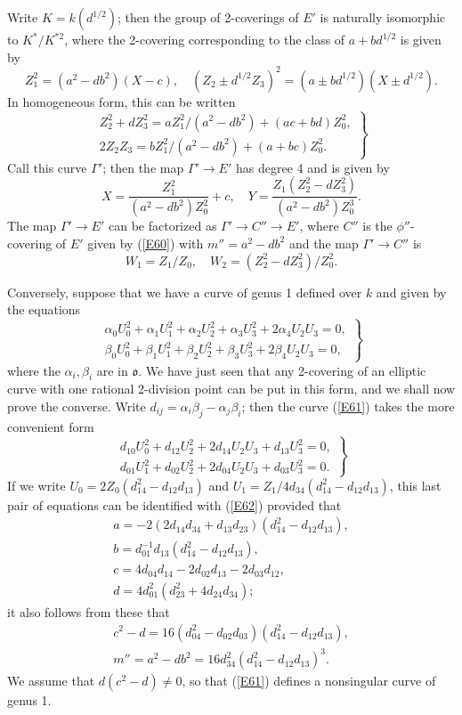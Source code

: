 \documentclass[12pt]{article}
\def\fo{{\mathfrak o}}
\def\ga{{\alpha}}
\def\gb{{\beta}}
\def\gG{{\Gamma}}
\def\beq{\begin{equation} \label}
\begin{document}
Write $K=k(d^{1/2})$; then the group of 2-coverings of $E'$
is naturally isomorphic to $K^*/K^{*2}$, where the 2-covering
corresponding to the class of $a+bd^{1/2}$ is given by
\[ Z_1^2=(a^2-db^2)(X-c), \quad
(Z_2\pm d^{1/2}Z_3)^2=(a\pm bd^{1/2})(X\pm d^{1/2}). \]
In homogeneous form, this can be written
\beq{E62} \left. \begin{array}{c}
Z_2^2+dZ_3^2=aZ_1^2/(a^2-db^2)+(ac+bd)Z_0^2, \\
2Z_2Z_3=bZ_1^2/(a^2-db^2)+(a+bc)Z_0^2.
\end{array} \right\} \end{equation}
Call this curve $\gG'$; then the map
$\gG'\rightarrow E'$ has degree 4 and is given by
\[ X=\frac{Z_1^2}{(a^2-db^2)Z_0^2}+c, \quad
Y=\frac{Z_1(Z_2^2-dZ_3^2)}{(a^2-db^2)Z_0^3}. \]
The map $\gG'\rightarrow E'$ can be factorized as
$\gG'\rightarrow C''\rightarrow E'$, where $C''$ is the
$\phi''$-covering of $E'$ given by (\ref{E60}) with
$m''=a^2-db^2$ and the map $\gG'\rightarrow C''$ is
\[ W_1=Z_1/Z_0, \quad W_2=(Z_2^2-dZ_3^2)/Z_0^2. \]

Conversely, suppose that we have a curve of genus 1 defined
over $k$ and given by the equations
\beq{E61} \left. \begin{array}{c}
\ga_0U_0^2+\ga_1U_1^2+\ga_2U_2^2+\ga_3U_3^2+2\ga_4U_2U_3=0, \\
\gb_0U_0^2+\gb_1U_1^2+\gb_2U_2^2+\gb_3U_3^2+2\gb_4U_2U_3=0,
\end{array} \right\} \end{equation}
where the $\ga_i,\gb_i$ are in $\fo$. We have just seen that
any 2-covering of an elliptic curve with one rational
2-division point can be put in this form, and we shall now
prove the converse. Write $d_{ij}=\ga_i\gb_j-\ga_j\gb_i$; then
the curve (\ref{E61}) takes the more convenient form
\beq{E63} \left. \begin{array}{c}
d_{10}U_0^2+d_{12}U_2^2+2d_{14}U_2U_3+d_{13}U_3^2=0, \\
d_{01}U_1^2+d_{02}U_2^2+2d_{04}U_2U_3+d_{03}U_3^2=0.
\end{array} \right\} \end{equation}
If we write $U_0=2Z_0(d_{14}^2-d_{12}d_{13})$ and
$U_1=Z_1/4d_{34}(d_{14}^2-d_{12}d_{13})$, this last pair of
equations can be identified with (\ref{E62}) provided that
\[ \begin{array}{c}
a=-2(2d_{14}d_{34}+d_{13}d_{23})(d_{14}^2-d_{12}d_{13}), \\
b=d_{01}^{-1}d_{13}(d_{14}^2-d_{12}d_{13}), \\
c=4d_{04}d_{14}-2d_{02}d_{13}-2d_{03}d_{12}, \\
d=4d_{01}^2(d_{23}^2+4d_{24}d_{34});
\end{array} \]
it also follows from these that
\[ \begin{array}{c}
c^2-d=16(d_{04}^2-d_{02}d_{03})(d_{14}^2-d_{12}d_{13}), \\
m''=a^2-db^2=16d_{34}^2(d_{14}^2-d_{12}d_{13})^3.
\end{array} \]
We assume that $d(c^2-d)\neq0$, so that (\ref{E61}) defines a
nonsingular curve of genus 1.
\end{document}
